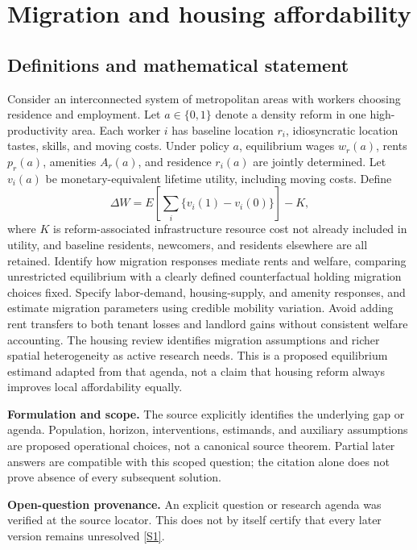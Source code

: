 \documentclass[11pt]{article}
\newcommand{\sref}[2]{\hyperlink{source:#1:#2}{[S#2]}}
\begin{document}
\section*{Migration and housing affordability}\label{30007743}
\subsection{Definitions and mathematical statement}
Consider an interconnected system of metropolitan areas with workers choosing residence and employment. Let \(a\in\{0,1\}\) denote a density reform in one high-productivity area. Each worker \(i\) has baseline location \(r_i\), idiosyncratic location tastes, skills, and moving costs. Under policy \(a\), equilibrium wages \(w_r(a)\), rents \(p_r(a)\), amenities \(A_r(a)\), and residence \(r_i(a)\) are jointly determined. Let \(v_i(a)\) be monetary-equivalent lifetime utility, including moving costs. Define
\[\Delta W=E\!\left[\sum_i\{v_i(1)-v_i(0)\}\right]-K,\]
where \(K\) is reform-associated infrastructure resource cost not already included in utility, and baseline residents, newcomers, and residents elsewhere are all retained. Identify how migration responses mediate rents and welfare, comparing unrestricted equilibrium with a clearly defined counterfactual holding migration choices fixed. Specify labor-demand, housing-supply, and amenity responses, and estimate migration parameters using credible mobility variation. Avoid adding rent transfers to both tenant losses and landlord gains without consistent welfare accounting. The housing review identifies migration assumptions and richer spatial heterogeneity as active research needs. This is a proposed equilibrium estimand adapted from that agenda, not a claim that housing reform always improves local affordability equally.

\par\textbf{Formulation and scope.} The source explicitly identifies the underlying gap or agenda. Population, horizon, interventions, estimands, and auxiliary assumptions are proposed operational choices, not a canonical source theorem. Partial later answers are compatible with this scoped question; the citation alone does not prove absence of every subsequent solution.

\par\textbf{Open-question provenance.} An explicit question or research agenda was verified at the source locator. This does not by itself certify that every later version remains unresolved \sref{30007743}{1}.
\end{document}
